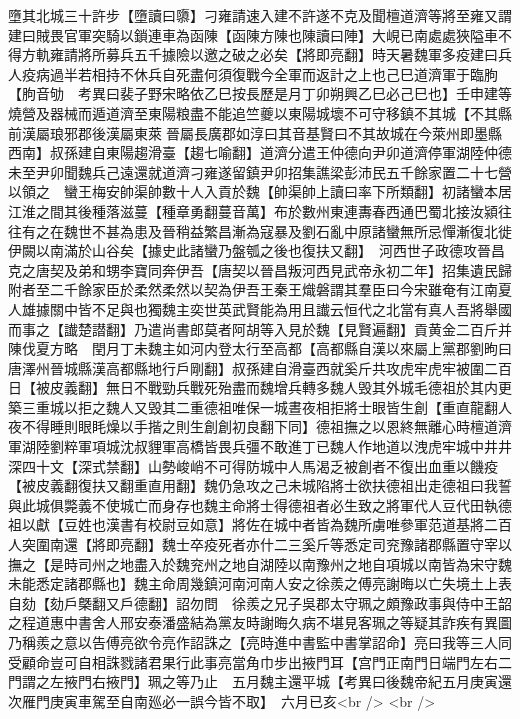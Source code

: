 墮其北城三十許步【墮讀曰隳】刁雍請速入建不許遂不克及聞檀道濟等將至雍又謂建曰賊畏官軍突騎以鎖連車為函陳【函陳方陳也陳讀曰陣】大峴已南處處狹隘車不得方軌雍請將所募兵五千據險以邀之破之必矣【將即亮翻】時天暑魏軍多疫建曰兵人疫病過半若相持不休兵自死盡何須復戰今全軍而返計之上也己巳道濟軍于臨朐【朐音劬　考異曰裴子野宋略依乙巳按長歷是月丁卯朔興乙巳必己巳也】壬申建等燒營及器械而遁道濟至東陽粮盡不能追竺夔以東陽城壞不可守移鎮不其城【不其縣前漢屬琅邪郡後漢屬東萊晉屬長廣郡如淳曰其音基賢曰不其故城在今萊州即墨縣西南】叔孫建自東陽趨滑臺【趨七喻翻】道濟分遣王仲德向尹卯道濟停軍湖陸仲德未至尹卯聞魏兵己遠還就道濟刁雍遂留鎮尹卯招集譙梁彭沛民五千餘家置二十七營以領之　蠻王梅安帥渠帥數十人入貢於魏【帥渠帥上讀曰率下所類翻】初諸蠻本居江淮之間其後種落滋蔓【種章勇翻蔓音萬】布於數州東連夀春西通巴蜀北接汝潁往往有之在魏世不甚為患及晉稍益繁昌漸為寇暴及劉石亂中原諸蠻無所忌憚漸復北徙伊闕以南滿於山谷矣【據史此諸蠻乃盤瓠之後也復扶又翻】　河西世子政德攻晉昌克之唐契及弟和甥李寶同奔伊吾【唐契以晉昌叛河西見武帝永初二年】招集遺民歸附者至二千餘家臣於柔然柔然以契為伊吾王秦王熾磐謂其羣臣曰今宋雖奄有江南夏人雄據關中皆不足與也獨魏主奕世英武賢能為用且䜟云恒代之北當有真人吾將舉國而事之【䜟楚譛翻】乃遣尚書郎莫者阿胡等入見於魏【見賢遍翻】貢黄金二百斤并陳伐夏方略　閏月丁未魏主如河内登太行至高都【高都縣自漢以來屬上黨郡劉昫曰唐澤州晉城縣漢高都縣地行戶剛翻】叔孫建自滑臺西就奚斤共攻虎牢虎牢被圍二百日【被皮義翻】無日不戰勁兵戰死殆盡而魏增兵轉多魏人毁其外城毛德祖於其内更築三重城以拒之魏人又毁其二重德祖唯保一城晝夜相拒將士眼皆生創【重直龍翻人夜不得睡則眼眊燥以手揩之則生創創初良翻下同】德祖撫之以恩終無離心時檀道濟軍湖陸劉粹軍項城沈叔貍軍高橋皆畏兵彊不敢進丁已魏人作地道以洩虎牢城中井井深四十文【深式禁翻】山勢峻峭不可得防城中人馬渴乏被創者不復出血重以饑疫【被皮義翻復扶又翻重直用翻】魏仍急攻之己未城陷將士欲扶德祖出走德祖曰我誓與此城俱斃義不使城亡而身存也魏主命將士得德祖者必生致之將軍代人豆代田執德祖以獻【豆姓也漢書有校尉豆如意】將佐在城中者皆為魏所虜唯參軍范道基將二百人突圍南還【將即亮翻】魏士卒疫死者亦什二三奚斤等悉定司兖豫諸郡縣置守宰以撫之【是時司州之地盡入於魏兖州之地自湖陸以南豫州之地自項城以南皆為宋守魏未能悉定諸郡縣也】魏主命周幾鎮河南河南人安之徐羨之傅亮謝晦以亡失境土上表自劾【劾戶槩翻又戶德翻】詔勿問　徐羨之兄子吳郡太守珮之頗豫政事與侍中王韶之程道惠中書舍人邢安泰潘盛結為黨友時謝晦久病不堪見客珮之等疑其詐疾有異圖乃稱羨之意以告傅亮欲令亮作詔誅之【亮時進中書監中書掌詔命】亮曰我等三人同受顧命豈可自相誅戮諸君果行此事亮當角巾步出掖門耳【宫門正南門日端門左右二門謂之左掖門右掖門】珮之等乃止　五月魏主還平城【考異曰後魏帝紀五月庚寅還次雁門庚寅車駕至自南廵必一誤今皆不取】　六月已亥<br />
<br />
